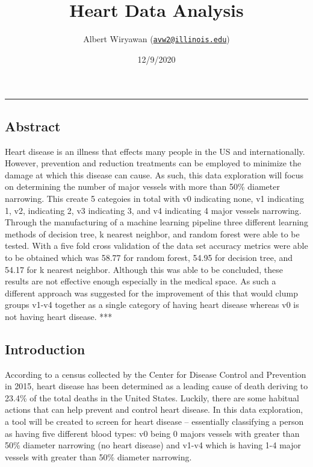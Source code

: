 \documentclass[
]{article}
\title{Heart Data Analysis}
\author{Albert Wiryawan
(\href{mailto:avw2@illinois.edu}{\nolinkurl{avw2@illinois.edu}})}
\date{12/9/2020}
\begin{document}
\maketitle

{
\setcounter{tocdepth}{2}
\tableofcontents
}
\begin{center}\rule{0.5\linewidth}{0.5pt}\end{center}

\hypertarget{abstract}{%
\subsection{Abstract}\label{abstract}}

Heart disease is an illness that effects many people in the US and
internationally. However, prevention and reduction treatments can be
employed to minimize the damage at which this disease can cause. As
such, this data exploration will focus on determining the number of
major vessels with more than 50\% diameter narrowing. This create 5
categoies in total with v0 indicating none, v1 indicating 1, v2,
indicating 2, v3 indicating 3, and v4 indicating 4 major vessels
narrowing. Through the manufacturing of a machine learning pipeline
three different learning methods of decision tree, k nearest neighbor,
and random forest were able to be tested. With a five fold cross
validation of the data set accuracy metrics were able to be obtained
which was 58.77 for random forest, 54.95 for decision tree, and 54.17
for k nearest neighbor. Although this was able to be concluded, these
results are not effective enough especially in the medical space. As
such a different approach was suggested for the improvement of this that
would clump groups v1-v4 together as a single category of having heart
disease whereas v0 is not having heart disease. ***

\hypertarget{introduction}{%
\subsection{Introduction}\label{introduction}}

According to a census collected by the Center for Disease Control and
Prevention in 2015, heart disease has been determined as a leading cause
of death deriving to 23.4\% of the total deaths in the United States.
Luckily, there are some habitual actions that can help prevent and
control heart disease. In this data exploration, a tool will be created
to screen for heart disease -- essentially classifying a person as
having five different blood types: v0 being 0 majors vessels with
greater than 50\% diameter narrowing (no heart disease) and v1-v4 which
is having 1-4 major vessels with greater than 50\% diameter narrowing.
\end{document}

